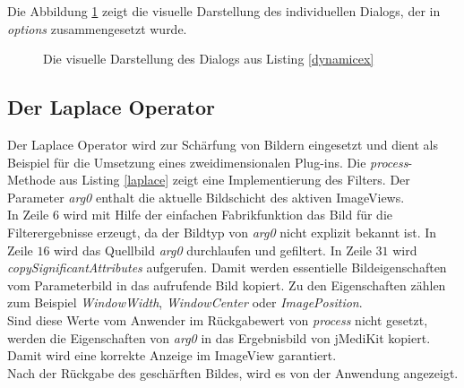 Die Abbildung \ref{dialog_example} zeigt die visuelle Darstellung des individuellen Dialogs, der in \textit{options} zusammengesetzt wurde. 

\begin{figure}[htbp]
  \vspace{0.5cm}
  \centering
   \caption{Die visuelle Darstellung des Dialogs aus Listing \ref{dynamicex}}
  \label{dialog_example}
  \vspace{0.5cm}
\end{figure}

\FloatBarrier
\subsection{Der Laplace Operator}

Der Laplace Operator wird zur Schärfung von Bildern eingesetzt und dient als Beispiel für die Umsetzung eines zweidimensionalen Plug-ins. Die \textit{process}-Methode aus Listing \ref{laplace} zeigt eine Implementierung des Filters. Der Parameter \textit{arg0} enthalt die aktuelle Bildschicht des aktiven ImageViews.\\
In Zeile $6$ wird mit Hilfe der einfachen Fabrikfunktion das Bild für die Filterergebnisse erzeugt, da der Bildtyp von \textit{arg0} nicht explizit bekannt ist. In Zeile $16$ wird das Quellbild \textit{arg0} durchlaufen und gefiltert. In Zeile $31$ wird \textit{copySignificantAttributes} aufgerufen. Damit werden essentielle Bildeigenschaften vom Parameterbild in das aufrufende Bild kopiert. Zu den Eigenschaften zählen zum Beispiel \textit{WindowWidth}, \textit{WindowCenter} oder \textit{ImagePosition}.\\
Sind diese Werte vom Anwender im Rückgabewert von \textit{process} nicht gesetzt, werden die Eigenschaften von \textit{arg0} in das Ergebnisbild von jMediKit kopiert. Damit wird eine korrekte Anzeige im ImageView garantiert.\\
Nach der Rückgabe des geschärften Bildes, wird es von der Anwendung angezeigt.

